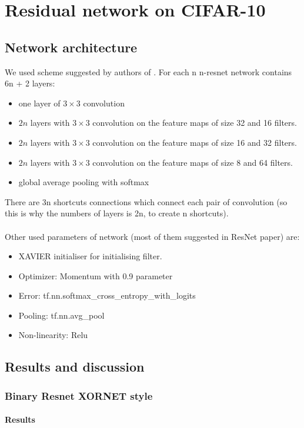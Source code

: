 \documentclass[licencjacka]{pracamgr}
\begin{document}
	\section{Residual network on CIFAR-10}
		\subsection{Network architecture}
			We used scheme suggested by authors of \cite{resnet}. For each n n-resnet network contains 6n + 2 layers:
			\begin{itemize}
			\item one layer of $3 \times 3$ convolution
			\item $2n$ layers with $3 \times 3$ convolution on the feature maps of size 32 and 16 filters.
			\item $2n$ layers with $3 \times 3$ convolution on the feature maps of size 16 and 32 filters.
			\item $2n$ layers with $3 \times 3$ convolution on the feature maps of size 8 and 64 filters.
			\item global average pooling with softmax
			\end{itemize}

			There are 3n shortcuts connections which connect each pair of convolution (so this is why the numbers of layers is 2n, to create n shortcuts).\\\\

			Other used parameters of network (most of them suggested in ResNet paper) are:
			\begin{itemize}
			\item XAVIER initialiser for initialising filter.
			\item Optimizer: Momentum with 0.9 parameter
			\item Error: tf.nn.softmax\_cross\_entropy\_with\_logits
			\item Pooling: tf.nn.avg\_pool
			\item Non-linearity: Relu
			\end{itemize}
		\subsection{Results and discussion}
			\subsubsection{Binary Resnet XORNET style}
		        \paragraph{Results} 
		        
\end{document}
